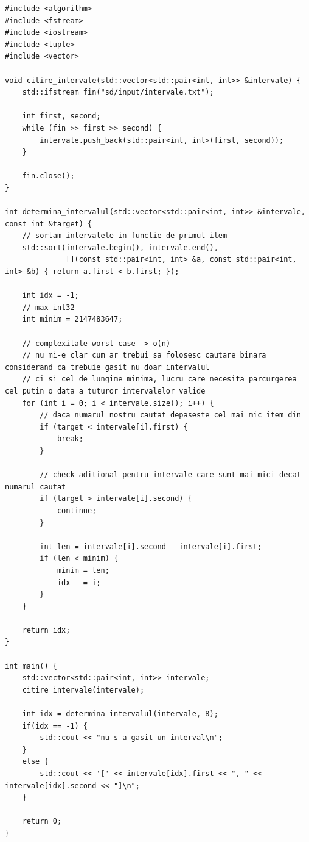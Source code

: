 \documentclass[12pt]{book}
\begin{document}
\begin{lstlisting}
#include <algorithm>
#include <fstream>
#include <iostream>
#include <tuple>
#include <vector>

void citire_intervale(std::vector<std::pair<int, int>> &intervale) {
    std::ifstream fin("sd/input/intervale.txt");

    int first, second;
    while (fin >> first >> second) {
        intervale.push_back(std::pair<int, int>(first, second));
    }

    fin.close();
}

int determina_intervalul(std::vector<std::pair<int, int>> &intervale, const int &target) {
    // sortam intervalele in functie de primul item
    std::sort(intervale.begin(), intervale.end(),
              [](const std::pair<int, int> &a, const std::pair<int, int> &b) { return a.first < b.first; });

    int idx = -1;
    // max int32
    int minim = 2147483647;

    // complexitate worst case -> o(n)
    // nu mi-e clar cum ar trebui sa folosesc cautare binara considerand ca trebuie gasit nu doar intervalul
    // ci si cel de lungime minima, lucru care necesita parcurgerea cel putin o data a tuturor intervalelor valide
    for (int i = 0; i < intervale.size(); i++) {
        // daca numarul nostru cautat depaseste cel mai mic item din
        if (target < intervale[i].first) {
            break;
        }

        // check aditional pentru intervale care sunt mai mici decat numarul cautat
        if (target > intervale[i].second) {
            continue;
        }

        int len = intervale[i].second - intervale[i].first;
        if (len < minim) {
            minim = len;
            idx   = i;
        }
    }

    return idx;
}

int main() {
    std::vector<std::pair<int, int>> intervale;
    citire_intervale(intervale);

    int idx = determina_intervalul(intervale, 8);
    if(idx == -1) {
        std::cout << "nu s-a gasit un interval\n";
    }
    else {
        std::cout << '[' << intervale[idx].first << ", " << intervale[idx].second << "]\n";
    }

    return 0;
}
\end{lstlisting}

\newpage
\end{document}

